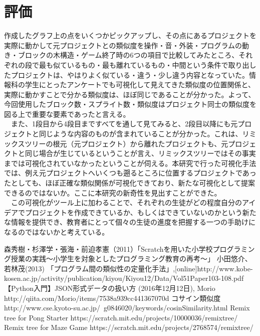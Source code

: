 \documentclass[twocolumn,9pt,a4paper]{jsarticle}
\begin{document}
\section{評価}
作成したグラフ上の点をいくつかピックアップし、その点にあるプロジェクトを実際に動かして元プロジェクトとの類似度を操作・音・外装・プログラムの動き・ブロックの木構造・ゲーム終了時の6つの項目で比較してみたところ、それぞれの段で最も似ているもの・最も離れているもの・中間という条件で取り出したプロジェクトは、やはりよく似ている・違う・少し違う内容となっていた。情報科の学生にとったアンケートでも可視化して見えてきた類似度の位置関係と、実際に動かすことで分かる類似度は、ほぼ同じであることが分かった。よって、今回使用したブロック数・スプライト数・類似度はプロジェクト同士の類似度を図る上で重要な要素であったと言える。
\\
　また、1段目から4段目まですべてを通して見てみると、2段目以降にも元プロジェクトと同じような内容のものが含まれていることが分かった。これは、リミックスツリーの根元（元プロジェクト）から離れたプロジェクトも、元プロジェクトと同じ場合が生じているということが言え、リミックスツリーではその事実までは可視化されていなかったということが伺える。本研究で行った可視化手法では、例え元プロジェクトへいくつも遡るところに位置するプロジェクトであったとしても、ほぼ正確な類似関係が可視化できており、新たな可視化として提案できるのではないか。ここに本研究の新奇性を見出すことができた。
\\
　この可視化がツール上に加わることで、それぞれの生徒がどの程度自分のアイデアでプロジェクトを作成できているか、もしくはできていないのかという新たな情報を提供でき、教育者にとって個々の生徒の進度を把握する一つの手助けになるのではないかと考えている。


\begin{thebibliography}{6}
森秀樹・杉澤学・張海・前迫孝憲（2011）「Scratchを用いた小学校プログラミング授業の実践〜小学生を対象としたプログラミング教育の再考〜」
小田悠介、若林茂(2013) 「プログラム間の類似性の定量化手法」,[online]http://www.kobe-kosen.ac.jp/activity/publication/kiyou/Kiyou12/Data/Vol51Paper103-108.pdf
【Python入門】JSON形式データの扱い方 (2016年12月12日), Morio http://qiita.com/Morio/items/7538a939cc441367070d
 コサイン類似度 http://www.cse.kyoto-su.ac.jp/~g0846020/keywords/cosinSimilarity.html
Remix tree for Pong Starter https://scratch.mit.edu/projects/10000036/remixtree/
Remix tree for Maze Game https://scratch.mit.edu/projects/2768574/remixtree/

\end{thebibliography}

%
%
\end{document}
